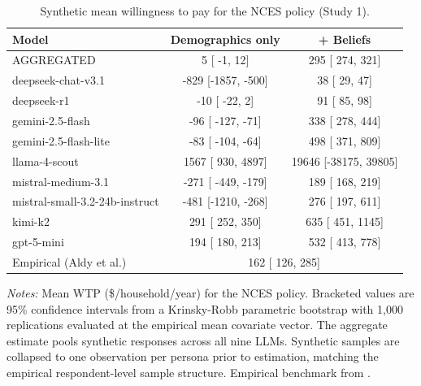 \begin{table}[H]
\centering
\caption{Synthetic mean willingness to pay for the NCES policy (Study 1).}
\label{tab:syn-wtp-Study1}
\begin{threeparttable}
\footnotesize
\begin{tabular}{lcc}
\toprule
Model & Demographics only & + Beliefs \\
\midrule
AGGREGATED &     5 [   -1,    12] &   295 [  274,   321] \\
\midrule
deepseek-chat-v3.1 &  -829 [-1857,  -500] &    38 [   29,    47] \\
deepseek-r1 &   -10 [  -22,     2] &    91 [   85,    98] \\
gemini-2.5-flash &   -96 [ -127,   -71] &   338 [  278,   444] \\
gemini-2.5-flash-lite &   -83 [ -104,   -64] &   498 [  371,   809] \\
llama-4-scout &  1567 [  930,  4897] & 19646 [-38175, 39805] \\
mistral-medium-3.1 &  -271 [ -449,  -179] &   189 [  168,   219] \\
mistral-small-3.2-24b-instruct &  -481 [-1210,  -268] &   276 [  197,   611] \\
kimi-k2 &   291 [  252,   350] &   635 [  451,  1145] \\
gpt-5-mini &   194 [  180,   213] &   532 [  413,   778] \\
\midrule
Empirical (Aldy et al.) & \multicolumn{2}{c}{  162 [  126,   285]} \\
\bottomrule
\end{tabular}
\begin{tablenotes}\footnotesize
\item \textit{Notes:} Mean WTP (\$/household/year) for the NCES policy. 
Bracketed values are 95\% confidence intervals from a Krinsky-Robb parametric bootstrap with 1{,}000 replications evaluated at the empirical mean covariate vector. 
The aggregate estimate pools synthetic responses across all nine LLMs. 
Synthetic samples are collapsed to one observation per persona prior to estimation, matching the empirical respondent-level sample structure. 
Empirical benchmark from \textcite{Aldy2012}.
\end{tablenotes}
\end{threeparttable}
\end{table}
